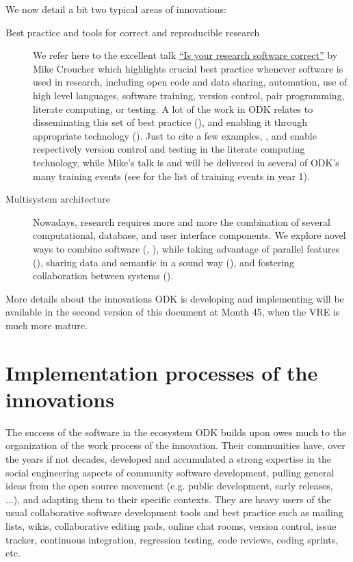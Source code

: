 \documentclass{deliverablereport}
\begin{document}
We now detail a bit two typical areas of innovations:
\begin{description}
\item[Best practice and tools for correct and reproducible research]
  We refer here to the excellent talk
  \href{https://mikecroucher.github.io/MLPM_talk/}{``Is your research
    software correct''} by Mike Croucher which highlights crucial best
  practice whenever software is used in research, including open code
  and data sharing, automation, use of high level languages, software
  training, version control, pair programming, literate computing, or
  testing. A lot of the work in ODK relates to disseminating this set of
  best practice (), and enabling it through
  appropriate technology ().  Just to cite a few
  examples, , and
   enable respectively version control
  and testing in the \Jupyter literate computing technology, while
  Mike's talk is and will be delivered in several of ODK's many
  training events (see  for the list
  of training events in year 1).
\item[Multisystem architecture] Nowadays, research requires more and
  more the combination of several computational, database, and user
  interface components. We explore novel ways to combine software
  (, ), while taking
  advantage of parallel features (), sharing data and
  semantic in a sound way (), and fostering
  collaboration between systems ().
\end{description}

More details about the innovations ODK is developing and implementing
will be available in the second version of this document at Month 45, 
when the VRE is much more mature.


\section{Implementation processes of the innovations}

The success of the software in the ecosystem ODK builds upon owes much
to the organization of the work process of the innovation. Their
communities have, over the years if not decades, developed and
accumulated a strong expertise in the social engineering aspects of
community software development, pulling general ideas from the open
source movement (e.g. public development, early releases, ...), and
adapting them to their specific contexts. They are heavy users of the
usual collaborative software development tools and best practice such
as mailing lists, wikis, collaborative editing pads, online chat
rooms, version control, issue tracker, continuous integration,
regression testing, code reviews, coding sprints, etc.
\end{document}
